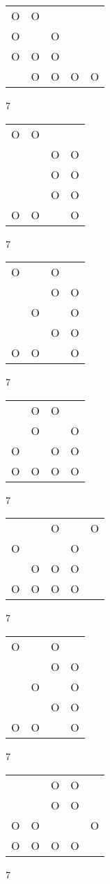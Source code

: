 \begin{tabular}{|m{0.2cm}m{0.2cm}m{0.2cm}m{0.2cm}m{0.2cm}|}\hline
O&O& & & \\
O& &O& & \\
O&O&O& & \\
 &O&O&O&O\\
\hline\end{tabular}7
\begin{tabular}{|m{0.2cm}m{0.2cm}m{0.2cm}m{0.2cm}|}\hline
O&O& & \\
 & &O&O\\
 & &O&O\\
 & &O&O\\
O&O& &O\\
\hline\end{tabular}7
\begin{tabular}{|m{0.2cm}m{0.2cm}m{0.2cm}m{0.2cm}|}\hline
O& &O& \\
 & &O&O\\
 &O& &O\\
 & &O&O\\
O&O& &O\\
\hline\end{tabular}7
\begin{tabular}{|m{0.2cm}m{0.2cm}m{0.2cm}m{0.2cm}|}\hline
 &O&O& \\
 &O& &O\\
O& &O&O\\
O&O&O&O\\
\hline\end{tabular}7
\begin{tabular}{|m{0.2cm}m{0.2cm}m{0.2cm}m{0.2cm}m{0.2cm}|}\hline
 & &O& &O\\
O& & &O& \\
 &O&O&O& \\
O&O&O&O& \\
\hline\end{tabular}7
\begin{tabular}{|m{0.2cm}m{0.2cm}m{0.2cm}m{0.2cm}|}\hline
O& &O& \\
 & &O&O\\
 &O& &O\\
 & &O&O\\
O&O& &O\\
\hline\end{tabular}7
\begin{tabular}{|m{0.2cm}m{0.2cm}m{0.2cm}m{0.2cm}m{0.2cm}|}\hline
 & &O&O& \\
 & &O&O& \\
O&O& & &O\\
O&O&O&O& \\
\hline\end{tabular}7
